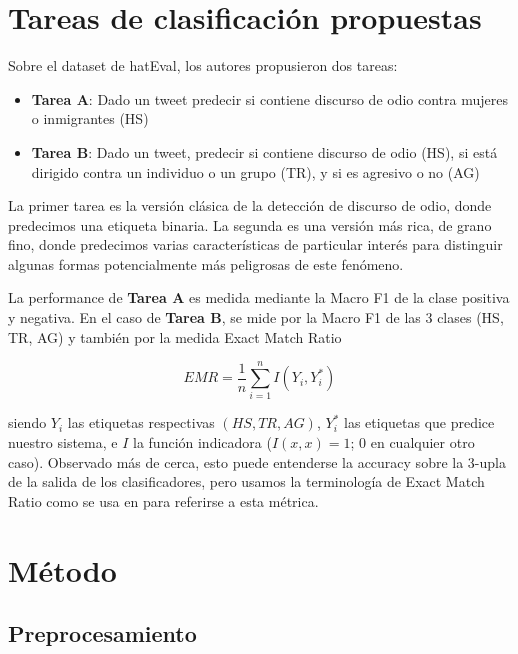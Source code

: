 \section{Tareas de clasificación propuestas}

Sobre el dataset de hatEval, los autores propusieron dos tareas:

\newcommand{\subtaska}[0]{\textbf{Tarea A}}
\newcommand{\subtaskb}[0]{\textbf{Tarea B}}

\begin{itemize}
    \item \subtaska{}: Dado un tweet predecir si contiene discurso de odio contra mujeres o inmigrantes (HS)
    \item \subtaskb{}: Dado un tweet, predecir si contiene discurso de odio (HS), si está dirigido contra un individuo o un grupo (TR), y si es agresivo o no (AG)
\end{itemize}


La primer tarea es la versión clásica de la detección de discurso de odio, donde predecimos una etiqueta binaria. La segunda es una versión más rica, de grano fino, donde predecimos varias características de particular interés para distinguir algunas formas potencialmente más peligrosas de este fenómeno.

La performance de \subtaska{} es medida mediante la Macro F1 de la clase positiva y negativa. En el caso de \subtaskb{}, se mide por la Macro F1 de las 3 clases (HS, TR, AG) y también por la medida Exact Match Ratio

\begin{equation*}
    EMR = \frac{1}{n} \sum\limits_{i=1}^{n} I(Y_i, Y_i^*)
\end{equation*}

siendo $Y_i$ las etiquetas respectivas $(HS, TR, AG)$, $Y_i^*$ las etiquetas que predice nuestro sistema, e  $I$ la función indicadora ($I(x, x) = 1$; $0$ en cualquier otro caso). Observado más de cerca, esto puede entenderse la accuracy sobre la 3-upla de la salida de los clasificadores, pero usamos la terminología de Exact Match Ratio como se usa en \citet{zhang-2014-multilabel} para referirse a esta métrica.

\section{Método}

\subsection{Preprocesamiento}
\label{sec:04_preprocessing}

